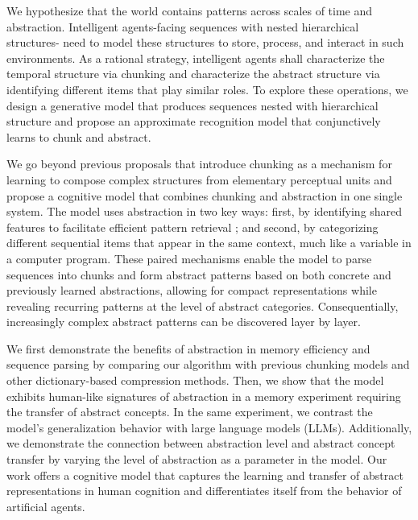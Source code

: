 \documentclass{article} %
\theoremstyle{remark}
\newcommand{\peter}[1]{\textcolor{purple}{Peter: #1}}
\begin{document}
We hypothesize that the world contains patterns across scales of time and abstraction. Intelligent agents-facing sequences with nested hierarchical structures- need to model these structures to store, process, and interact in such environments. As a rational strategy, intelligent agents shall characterize the temporal structure via chunking and characterize the abstract structure via identifying  different items that play similar roles. To explore these operations, we design a generative model that produces sequences nested with hierarchical structure and propose an approximate recognition model that conjunctively learns to chunk and abstract.

We go beyond previous proposals that introduce chunking as a mechanism for learning to compose complex structures from elementary perceptual units \citep{Gobet2001, Miller1956TheInformation, wu_learning_2022} and propose a cognitive model that combines chunking and abstraction in one single system. The model uses abstraction in two key ways: first, by identifying shared features to facilitate efficient pattern retrieval%
; and second, by categorizing different sequential items that appear in the same context, much like a variable in a computer program. %
These paired mechanisms enable the model to parse sequences into chunks and form abstract patterns based on both concrete and previously learned abstractions, allowing for compact representations while revealing recurring patterns at the level of abstract categories. Consequentially,  increasingly complex abstract patterns can be discovered layer by layer.%

We first demonstrate the benefits of abstraction in memory efficiency and sequence parsing by comparing our algorithm with previous chunking models and other dictionary-based compression methods. Then, we show that the model exhibits human-like signatures of abstraction in a memory experiment requiring the transfer of abstract concepts. In the same experiment, we contrast the model's generalization behavior with large language models (LLMs). Additionally, we demonstrate the connection between abstraction level and abstract concept transfer by varying the level of abstraction as a parameter in the model. Our work offers a cognitive model that captures the learning and transfer of abstract representations in human cognition and differentiates itself from the behavior of artificial agents. %
\end{document}
